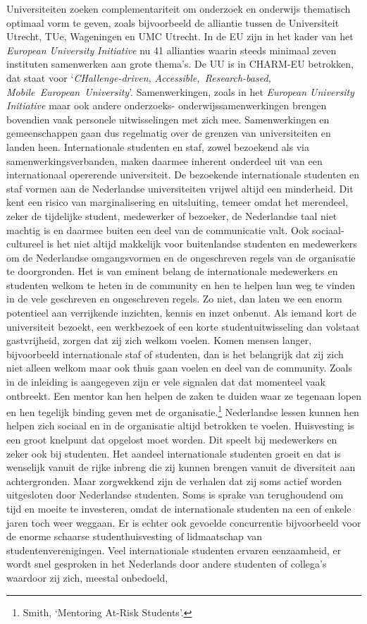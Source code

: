 \documentclass[smallauthor, chapterhaspagenum, nochapterinheader, pagenuminheader,  bigchapnum,medium2, tocpages, garamond, titleinheader]{jote-book}
\begin{document}
	Universiteiten zoeken complementariteit om onderzoek en onderwijs thematisch optimaal vorm te geven, zoals bijvoorbeeld de alliantie tussen de Universiteit Utrecht, TUe, Wageningen en UMC Utrecht. In de EU zijn in het kader van het \emph{European University }\emph{Initiative} nu 41 allianties waarin steeds minimaal zeven instituten samenwerken aan grote thema's. De UU is in CHARM-EU betrokken, dat staat voor ‘\emph{CHallenge-driven}\emph{, }\emph{Accessible}\emph{, Research-}\emph{based}\emph{, Mobile European University}'. Samenwerkingen, zoals in het \emph{European University }\emph{Initiative} maar ook andere onderzoeks- onderwijssamenwerkingen brengen bovendien vaak personele uitwisselingen met zich mee. Samenwerkingen en gemeenschappen gaan dus regelmatig over de grenzen van universiteiten en landen heen. Internationale studenten en staf, zowel bezoekend als via samenwerkingsverbanden, maken daarmee inherent onderdeel uit van een internationaal opererende universiteit. De bezoekende internationale studenten en staf vormen aan de Nederlandse universiteiten vrijwel altijd een minderheid. Dit kent een risico van marginalisering en uitsluiting, temeer omdat het merendeel, zeker de tijdelijke student, medewerker of bezoeker, de Nederlandse taal niet machtig is en daarmee buiten een deel van de communicatie valt. Ook sociaal-cultureel is het niet altijd makkelijk voor buitenlandse studenten en medewerkers om de Nederlandse omgangsvormen en de ongeschreven regels van de organisatie te doorgronden. Het is van eminent belang de internationale medewerkers en studenten welkom te heten in de community en hen te helpen hun weg te vinden in de vele geschreven en ongeschreven regels. Zo niet, dan laten we een enorm potentieel aan verrijkende inzichten, kennis en inzet onbenut. Als iemand kort de universiteit bezoekt, een werkbezoek of een korte studentuitwisseling dan volstaat gastvrijheid, zorgen dat zij zich welkom voelen. Komen mensen langer, bijvoorbeeld internationale staf of studenten, dan is het belangrijk dat zij zich niet alleen welkom maar ook thuis gaan voelen en deel van de community. Zoals in de inleiding is aangegeven zijn er vele signalen dat dat momenteel vaak ontbreekt. Een mentor kan hen helpen de zaken te duiden waar ze tegenaan lopen en hen tegelijk binding geven met de organisatie.\footnote{Smith, ‘Mentoring At-Risk Students'.} Nederlandse lessen kunnen hen helpen zich sociaal en in de organisatie altijd betrokken te voelen. Huisvesting is een groot knelpunt dat opgelost moet worden. Dit speelt bij medewerkers en zeker ook bij studenten. Het aandeel internationale studenten groeit en dat is wenselijk vanuit de rijke inbreng die zij kunnen brengen vanuit de diversiteit aan achtergronden. Maar zorgwekkend zijn de verhalen dat zij soms actief worden uitgesloten door Nederlandse studenten. Soms is sprake van terughoudend om tijd en moeite te investeren, omdat de internationale studenten na een of enkele jaren toch weer weggaan. Er is echter ook gevoelde concurrentie bijvoorbeeld voor de enorme schaarse studenthuisvesting of lidmaatschap van studentenverenigingen. Veel internationale studenten ervaren eenzaamheid, er wordt snel gesproken in het Nederlands door andere studenten of collega's waardoor zij zich, meestal onbedoeld, 
\end{document}
